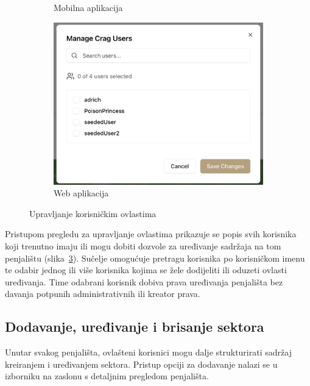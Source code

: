 \begin{figure}[H]
\begin{subfigure}[b]{0.36\textwidth}
        \caption{Mobilna aplikacija}
        \label{fig:upravljanje_ovlastima_mob}
    \end{subfigure}
    \hfill
    \begin{subfigure}[b]{0.6\textwidth}
        \centering
        \includegraphics[width=\textwidth]{images/implementacija/web/editing-options/manage-users.png}
        \caption{Web aplikacija}
        \label{fig:upravljanje_ovlastima_web}
    \end{subfigure}
    \caption{Upravljanje korisničkim ovlastima}
    \label{fig:upravljanje_ovlastima}
\end{figure}

Pristupom pregledu za upravljanje ovlastima prikazuje se popis svih korisnika koji trenutno imaju ili mogu dobiti dozvole za uređivanje sadržaja na tom penjalištu (slika~\ref{fig:upravljanje_ovlastima}). Sučelje omogućuje pretragu korisnika po korisničkom imenu te odabir jednog ili više korisnika kojima se žele dodijeliti ili oduzeti ovlasti uređivanja. Time odabrani korisnik dobiva prava uređivanja penjališta bez davanja potpunih administrativnih ili kreator prava.


\subsection{Dodavanje, uređivanje i brisanje sektora}

Unutar svakog penjališta, ovlašteni korisnici mogu dalje strukturirati sadržaj kreiranjem i uređivanjem sektora. Pristup opciji za dodavanje nalazi se u izborniku na zaslonu s detaljnim pregledom penjališta. 

